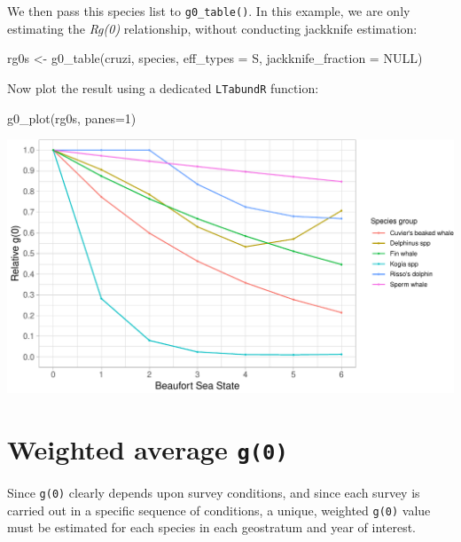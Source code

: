 \documentclass[
]{book}
\newenvironment{Shaded}{\begin{snugshade}}{\end{snugshade}}
\newcommand{\AttributeTok}[1]{\textcolor[rgb]{0.77,0.63,0.00}{#1}}
\newcommand{\ConstantTok}[1]{\textcolor[rgb]{0.00,0.00,0.00}{#1}}
\newcommand{\DecValTok}[1]{\textcolor[rgb]{0.00,0.00,0.81}{#1}}
\newcommand{\FunctionTok}[1]{\textcolor[rgb]{0.00,0.00,0.00}{#1}}
\newcommand{\NormalTok}[1]{#1}
\newcommand{\OtherTok}[1]{\textcolor[rgb]{0.56,0.35,0.01}{#1}}
\newcommand{\StringTok}[1]{\textcolor[rgb]{0.31,0.60,0.02}{#1}}
\begin{document}
We then pass this species list to \texttt{g0\_table()}. In this example, we are only estimating the \emph{Rg(0)} relationship, without conducting jackknife estimation:

\begin{Shaded}
\begin{Highlighting}[]
\NormalTok{rg0s }\OtherTok{\textless{}{-}} \FunctionTok{g0\_table}\NormalTok{(cruzi,}
\NormalTok{               species,}
               \AttributeTok{eff\_types =} \StringTok{\textquotesingle{}S\textquotesingle{}}\NormalTok{,}
               \AttributeTok{jackknife\_fraction =} \ConstantTok{NULL}\NormalTok{)}
\end{Highlighting}
\end{Shaded}

Now plot the result using a dedicated \texttt{LTabundR} function:

\begin{Shaded}
\begin{Highlighting}[]
\FunctionTok{g0\_plot}\NormalTok{(rg0s, }\AttributeTok{panes=}\DecValTok{1}\NormalTok{)}
\end{Highlighting}
\end{Shaded}

\includegraphics{figures/unnamed-chunk-208-1.pdf}

\hypertarget{weighted-average-g0}{%
\section*{\texorpdfstring{Weighted average \texttt{g(0)}}{Weighted average g(0)}}\label{weighted-average-g0}}

Since \texttt{g(0)} clearly depends upon survey conditions, and since each survey is carried out in a specific sequence of conditions, a unique, weighted \texttt{g(0)} value must be estimated for each species in each geostratum and year of interest.
\end{document}
